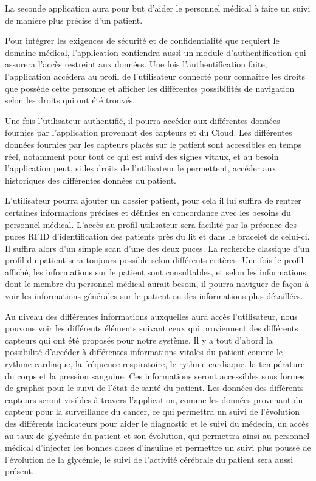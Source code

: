 La seconde application aura pour but d’aider le personnel médical à faire un suivi de manière plus précise d’un patient.

Pour intégrer les exigences de sécurité et de confidentialité que requiert le domaine médical, l’application contiendra aussi un module d’authentification qui assurera l’accès restreint aux données. Une fois l’authentification faite, l’application accédera au profil de l’utilisateur connecté pour connaître les droits que possède cette personne et afficher les différentes possibilités de navigation selon les droits qui ont été trouvés.

Une fois l’utilisateur authentifié, il pourra accéder aux différentes données fournies par l’application provenant des capteurs et
du Cloud. Les différentes données fournies par les capteurs placés sur le patient sont accessibles en temps réel, notamment pour
tout ce qui est suivi des signes vitaux, et au besoin l’application peut, si les droits de l’utilisateur le permettent, accéder
aux historiques des différentes données du patient.

L’utilisateur pourra ajouter un dossier patient, pour cela il lui suffira de rentrer certaines informations précises et définies en concordance avec les besoins du personnel médical. L’accès au profil utilisateur sera facilité par la présence des puces RFID d’identification des patients près du lit et dans le bracelet de celui-ci. Il suffira alors d’un simple scan d’une des deux puces. La recherche classique d’un profil du patient sera toujours possible selon différents critères. Une fois le profil affiché, les informations sur le patient sont consultables, et selon les informations dont le membre du personnel médical aurait besoin, il pourra naviguer de façon à voir les informations générales sur le patient ou des informations plus détaillées.

Au niveau des différentes informations auxquelles aura accès l’utilisateur, nous pouvons voir les différents éléments suivant ceux qui
proviennent des différents capteurs qui ont été proposés pour notre système. Il y a tout d’abord la possibilité d’accéder à
différentes informations vitales du patient comme le rythme cardiaque, la fréquence respiratoire, le rythme cardiaque, la
température du corps et la pression sanguine. Ces informations seront accessibles sous formes de graphes pour le suivi de l’état
de santé du patient. Les données des différents capteurs seront visibles à travers l’application, comme les données provenant du capteur pour la surveillance du cancer, ce qui permettra un suivi de l’évolution des différents indicateurs pour aider le diagnostic et le suivi du médecin, un accès au taux de glycémie du patient et son évolution, qui permettra ainsi au personnel médical d’injecter les bonnes doses d’insuline et permettre un suivi plus poussé de l’évolution de la glycémie, le suivi de l’activité cérébrale du patient sera aussi présent.

